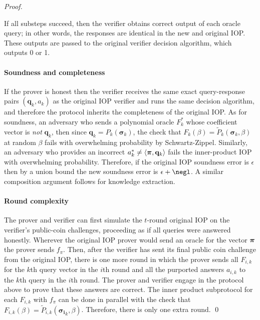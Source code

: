 \begin{proof}
\begin{itemize}
\end{itemize}

If all substeps succeed, then the verifier obtains correct output of each oracle query; in other words, the responses are identical in the new and original IOP. These outputs are passed to the original verifier decision algorithm, which outputs 0 or 1.

\paragraph{Soundness and completeness} If the prover is honest then the verifier receives the same exact query-response pairs $(\mathbf{q}_k, a_k)$ as the original IOP verifier and runs the same decision algorithm, and therefore the protocol inherits the completeness of the original IOP. As for soundness, an adversary who sends a polynomial oracle $F_k^*$ whose coefficient vector is \emph{not} $\mathbf{q}_k$, then since $\mathbf{q}_k = P_k(\boldsymbol{\sigma}_k)$, the check that $F_k (\beta) = \tilde{P}_k(\boldsymbol{\sigma}_k, \beta)$ at random $\beta$ fails with overwhelming probability by Schwartz-Zippel. Similarly, an adversary who provides an incorrect $a_k^* \neq \langle \boldsymbol{\pi}, \mathbf{q}_k \rangle$ fails the inner-product IOP with overwhelming probability.
Therefore, if the original IOP soundness error is $\epsilon$ then by a union bound the new soundness error is $\epsilon + \negl$. A similar composition argument follows for knowledge extraction.%

\paragraph{Round complexity} The prover and verifier can first simulate the $t$-round original IOP  on the verifier's public-coin challenges, proceeding as if all queries were answered honestly. Wherever the original IOP prover would send an oracle for the vector $\boldsymbol{\pi}$ the prover sends $f_\pi$. Then, after the verifier has sent its final public coin challenge from the original IOP, there is one more round in which the prover sends all $F_{i, k}$ for the $k$th query vector in the $i$th round and all the purported answers $a_{i, k}$ to the $k$th query in the $i$th round. The prover and verifier engage in the protocol above to prove that these answers are correct. The inner product subprotocol for each $F_{i,k}$ with $f_\pi$ can be done in parallel with the check that $F_{i,k}(\beta) = \tilde{P}_{i,k}(\boldsymbol{\sigma_i}_k, \beta)$. Therefore, there is only one extra round. \qed   
\end{proof}

